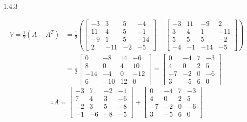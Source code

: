 \documentclass{article}
\theoremstyle{definition}
\begin{document}
\begin{prob}{1.4.3}
\begin{enumerate}[label=(\alph*)]
\begin{align*}
					V = \frac{1}{2}(A-A^T) &= \frac{1}{2} \left( \begin{bmatrix} -3 & 3 & 5 & -4 \\ 11 & 4 & 5 & -1 \\ -9 & 1 & 5 & -14 \\ 2 & -11 & -2 & -5 \end{bmatrix} - \begin{bmatrix} -3 & 11 & -9 & 2 \\ 3 & 4 & 1 & -11 \\ 5 & 5 & 5 & -2 \\ -4 & -1 & -14 & -5 \end{bmatrix} \right) \\
					&= \frac{1}{2} \begin{bmatrix} 0 & -8 & 14 & -6 \\ 8 & 0 & 4 & 10 \\ -14 & -4 & 0 & -12 \\ 6 & -10 & 12 & 0 \end{bmatrix} = \begin{bmatrix} 0 & -4 & 7 & -3 \\ 4 & 0 & 2 & 5 \\ -7 & -2 & 0 & -6 \\ 3 & -5 & 6 & 0 \end{bmatrix}
				\end{align*}
				$$ \therefore \boxed{ A = \begin{bmatrix} -3 & 7 & -2 & -1 \\ 7 & 4 & 3 & -6 \\ -2 & 3 & 5 & -8 \\ -1 & -6 & -8 & -5 \end{bmatrix} + \begin{bmatrix} 0 & -4 & 7 & -3 \\ 4 & 0 & 2 & 5 \\ -7 & -2 & 0 & -6 \\ 3 & -5 & 6 & 0 \end{bmatrix} } $$
		\end{enumerate}
	\end{prob}
\end{document}
